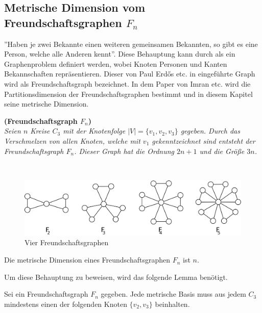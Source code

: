 \subsection{Metrische Dimension vom Freundschaftsgraphen $F_{n}$}
''Haben je zwei Bekannte einen weiteren gemeinsamen Bekannten, so gibt es eine Person, welche alle Anderen kennt''. Diese Behauptung kann durch als ein Graphenproblem definiert werden, wobei Knoten Personen und Kanten Bekannschaften repräsentieren.  Dieser von Paul Erdős etc. in \cite{Erdos} eingeführte Graph wird als Freundschaftsgraph bezeichnet. In dem Paper von Imran etc. wird die Partitionsdimension der Freundschaftsgraphen bestimmt und in diesem Kapitel seine metrische Dimension.
\begin{defi}{\textbf{(Freundschaftsgraph $F_n$)}}\\
\emph{Seien $n$ Kreise $C_3$ mit der Knotenfolge $|V|=\{v_1,v_2,v_3\}$ gegeben. Durch das Verschmelzen von allen Knoten, welche mit $v_1$ gekenntzeichnet sind entsteht der Freundschaftsgraph $F_n$. Dieser Graph hat die Ordnung $2n+1$ und die Größe $3n$.}
\end{defi}
\begin{bsp}\textcolor{white}{lala}
\begin{figure}[h!]
\centering
 		 \includegraphics[width=428pt]{bilder/freunschaftsgraph.pdf}
   \caption{Vier Freundschaftsgraphen}
   \label{bild:fg}
\end{figure}
\end{bsp}
\begin{lem}
\label{Freundschaftsgraphen}
Die metrische Dimension eines Freundschaftsgraphen $F_n$ ist $n$.
\end{lem}
\vspace{-1mm}
Um diese Behauptung zu beweisen, wird das folgende Lemma benötigt. 
\begin{lem}
\label{mindfreundschaftsgraph}
Sei ein Freundschaftsgraph $F_n$ gegeben. Jede metrische Basis muss aus jedem $C_3$ mindestens einen der folgenden Knoten $\{v_{2},v_{3}\}$ beinhalten.
\end{lem}
\newpage
